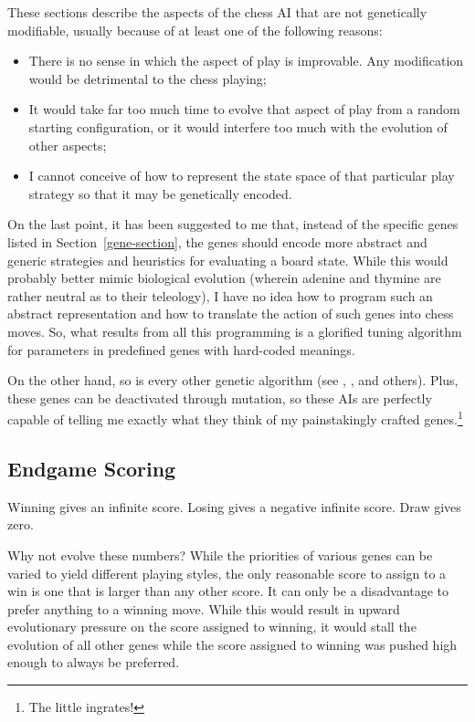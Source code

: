 \documentclass[letter]{article}
\renewcommand\_{\textunderscore\allowbreak}
\begin{document}
These sections describe the aspects of the chess AI that are not genetically modifiable, usually because of at least one of the following reasons:
\begin{itemize}
	\item There is no sense in which the aspect of play is improvable. Any modification would be detrimental to the chess playing;
	\item It would take far too much time to evolve that aspect of play from a random starting configuration, or it would interfere too much with the evolution of other aspects;
	\item I cannot conceive of how to represent the state space of that particular play strategy so that it may be genetically encoded.
\end{itemize}
On the last point, it has been suggested to me that, instead of the specific genes listed in Section~\ref{gene-section}, the genes should encode more abstract and generic strategies and heuristics for evaluating a board state. While this would probably better mimic biological evolution (wherein adenine and thymine are rather neutral as to their teleology), I have no idea how to program such an abstract representation and how to translate the action of such genes into chess moves. So, what results from all this programming is a glorified tuning algorithm for parameters in predefined genes with hard-coded meanings.

On the other hand, so is every other genetic algorithm (see \cite{evolved-antenna}, \cite{evolved-stellarator}, and others). Plus, these genes can be deactivated through mutation, so these AIs are perfectly capable of telling me exactly what they think of my painstakingly crafted genes.\footnote{The little ingrates!}

\subsection{Endgame Scoring}

Winning gives an infinite score.
Losing gives a negative infinite score.
Draw gives zero.

Why not evolve these numbers? While the priorities of various genes can be varied to yield different playing styles, the only reasonable score to assign to a win is one that is larger than any other score. It can only be a disadvantage to prefer anything to a winning move. While this would result in upward evolutionary pressure on the score assigned to winning, it would stall the evolution of all other genes while the score assigned to winning was pushed high enough to always be preferred.
\end{document}
